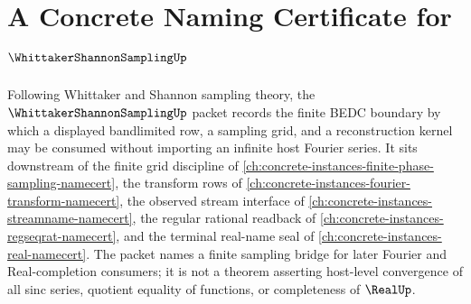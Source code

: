 \chapter{A Concrete Naming Certificate for $\WhittakerShannonSamplingUp$}
\label{ch:concrete-instances-whittaker-shannon-sampling-namecert}

Following Whittaker and Shannon sampling theory, the $\WhittakerShannonSamplingUp$ packet records the finite BEDC boundary by which a displayed bandlimited row, a sampling grid, and a reconstruction kernel may be consumed without importing an infinite host Fourier series. It sits downstream of the finite grid discipline of \autoref{ch:concrete-instances-finite-phase-sampling-namecert}, the transform rows of \autoref{ch:concrete-instances-fourier-transform-namecert}, the observed stream interface of \autoref{ch:concrete-instances-streamname-namecert}, the regular rational readback of \autoref{ch:concrete-instances-regseqrat-namecert}, and the terminal real-name seal of \autoref{ch:concrete-instances-real-namecert}. The packet names a finite sampling bridge for later Fourier and Real-completion consumers; it is not a theorem asserting host-level convergence of all sinc series, quotient equality of functions, or completeness of $\RealUp$.

